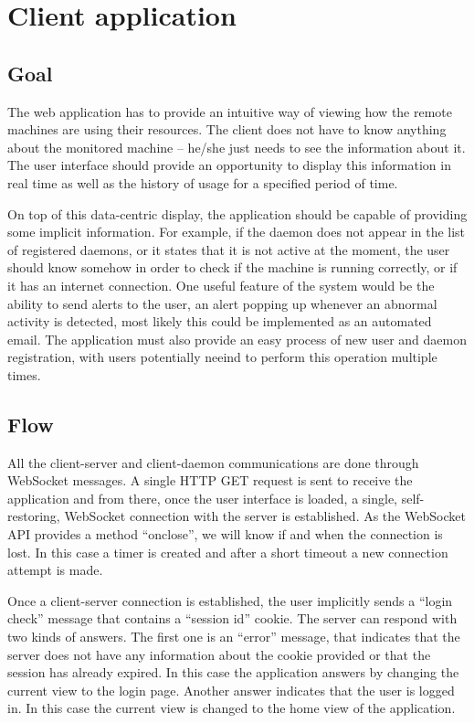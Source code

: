 \documentclass{l3proj}
\begin{document}
\section{Client application}

\subsection{Goal}

The web application has to provide an intuitive way of viewing how the remote machines are using their resources. The client does not have to know anything about the monitored machine -- he/she just needs to see the information about it. The user interface should provide an opportunity to display this information in real time as well as the history of usage for a specified period of time.

On top of this data-centric display, the application should be capable of providing some implicit information. For example, if the daemon does not appear in the list of registered daemons, or it states that it is not active at the moment, the user should know somehow in order to check if the machine is running correctly, or if it has an internet connection. One useful feature of the system would be the ability to send alerts to the user, an alert popping up whenever an abnormal activity is detected, most likely this could be implemented as an automated email. The application must also provide an easy process of new user and daemon registration, with users potentially neeind to perform this operation multiple times.


\subsection{Flow}

All the client-server and client-daemon communications are done through WebSocket messages. A single HTTP GET request is sent to receive the application and from there, once the user interface is loaded, a single, self-restoring, WebSocket connection with the server is established. As the WebSocket API provides a method ``onclose'', we will know if and when the connection is lost. In this case a timer is created and after a short timeout a new connection attempt is made.

Once a client-server connection is established, the user implicitly sends a ``login check'' message that contains a ``session id'' cookie. The server can respond with two kinds of answers. The first one is an ``error'' message, that indicates that the server does not have any information about the cookie provided or that the session has already expired. In this case the application answers by changing the current view to the login page. Another answer indicates that the user is logged in. In this case the current view is changed to the home view of the application.
\end{document}
